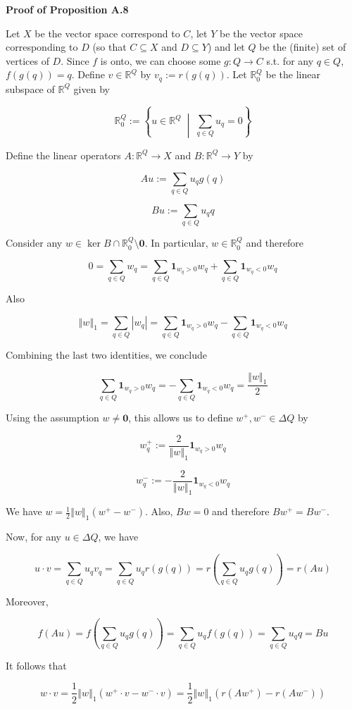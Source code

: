 \documentclass[a4paper]{article}
\newcommand{\Co}[1]{}
\newcommand{\AP}[1]{\left(#1\right)}
\newcommand{\ACM}[2]{\left\{#1\;\middle\vert\;#2\right\}}
\newcommand{\Abs}[1]{\left\vert #1 \right\vert}
\newcommand{\Norm}[1]{\left\Vert #1 \right\Vert}
\newcommand{\Reals}{\mathbb{R}}
\DeclareMathOperator{\Ker}{ker}
\begin{document}
\textbf{Proof of Proposition A.8}\Co{b}

Let $X$ be the vector space correspond to $C$, let $Y$ be the vector space corresponding to $D$ (so that $C\subseteq X$ and $D\subseteq Y$) and let $Q$ be the (finite) set of vertices of $D$. Since $f$ is onto, we can choose some $g:Q\rightarrow C$ s.t. for any $q\in Q$, $f\AP{g(q)}=q$. Define $v\in\Reals^Q$ by $v_q:=r\AP{g(q)}$. Let $\Reals^Q_0$ be the linear subspace of $\Reals^Q$ given by 

$$\Reals^Q_0:=\ACM{u\in\Reals^Q}{\sum_{q\in Q}u_q = 0}$$

Define the linear operators $A:\Reals^Q\rightarrow X$ and $B:\Reals^Q\rightarrow Y$ by

$$Au:=\sum_{q\in Q}u_q g(q)$$

$$Bu:=\sum_{q\in Q}u_q q$$

Consider any $w\in\Ker{B}\cap\Reals^Q_0\setminus\boldsymbol{0}$. In particular, $w\in\Reals^Q_0$ and therefore

$$0=\sum_{q\in Q}w_q=\sum_{q\in Q}\boldsymbol{1}_{w_q>0}w_q+\sum_{q\in Q}\boldsymbol{1}_{w_q<0}w_q$$

Also

$$\Norm{w}_1=\sum_{q\in Q}\Abs{w_q}=\sum_{q\in Q}\boldsymbol{1}_{w_q>0}w_q-\sum_{q\in Q}\boldsymbol{1}_{w_q<0}w_q$$

Combining the last two identities, we conclude

$$\sum_{q\in Q}\boldsymbol{1}_{w_q>0}w_q =-\sum_{q\in Q}\boldsymbol{1}_{w_q<0}w_q=\frac{\Norm{w}_1}{2}$$

Using the assumption $w\ne\boldsymbol{0}$, this allows us to define $w^+,w^-\in\Delta Q$ by

$$w^+_q:=\frac{2}{\Norm{w}_1}\boldsymbol{1}_{w_q>0}w_q$$

$$w^-_q:=-\frac{2}{\Norm{w}_1}\boldsymbol{1}_{w_q<0}w_q$$

We have $w=\frac{1}{2}\Norm{w}_1\AP{w^+-w^-}$. Also, $Bw=0$ and therefore $Bw^+=Bw^-$. 

Now, for any $u\in\Delta Q$, we have

$$u\cdot v=\sum_{q\in Q}u_q v_q=\sum_{q\in Q}u_q r\AP{g(q)}=r\AP{\sum_{q\in Q}u_q g(q)}=r\AP{Au}$$ 

Moreover,

$$f\AP{Au}=f\AP{\sum_{q\in Q}u_q g(q)}=\sum_{q\in Q}u_q f\AP{g(q)}=\sum_{q\in Q}u_q q = Bu$$

It follows that

$$w\cdot v=\frac{1}{2}\Norm{w}_1\AP{w^+\cdot v - w^-\cdot v}=\frac{1}{2}\Norm{w}_1\AP{r\AP{Aw^+}-r\AP{Aw^-}}$$
\end{document}

